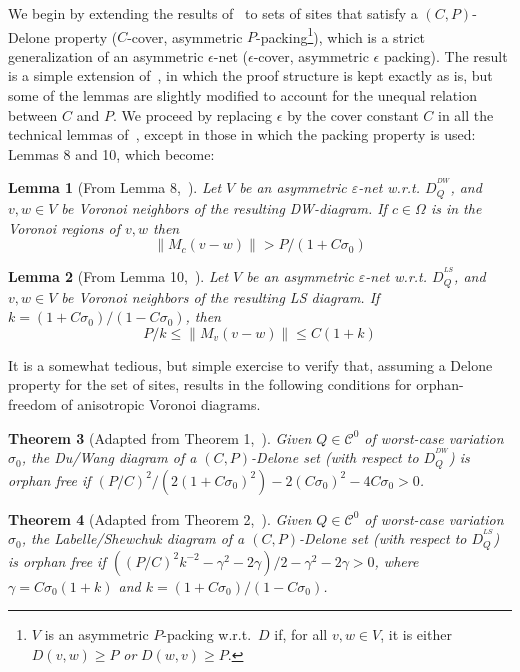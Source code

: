\documentclass[11pt]{article}
\newtheorem{theorem}{Theorem}[section]
\newtheorem{lemma}[theorem]{Lemma}
\newcommand{\e}{\varepsilon}
\newcommand{\s}{\sigma}
\renewcommand{\O}{\Omega}
\newcommand{\C}{\mathcal{C}}
\begin{document}
We begin by extending the results of~\cite{avd} to sets of sites that satisfy a $(C,P)$-Delone property ($C$-cover, asymmetric $P$-packing\footnote{$V$ is an asymmetric $P$-packing w.r.t.\ $D$ if, for all $v,w\in V$, it is either $D(v,w)\ge P$ \emph{or} $D(w,v)\ge P$.}), 
	which is a strict generalization of an asymmetric $\epsilon$-net ($\epsilon$-cover, asymmetric $\epsilon$ packing). 
The result is a simple extension of~\cite{avd}, in which the proof structure is kept exactly as is, 
	but some of the lemmas are slightly modified to account for the unequal relation between $C$ and $P$. 
We proceed by replacing $\epsilon$ by the cover constant $C$ in all the technical lemmas of~\cite{avd}, 
	except in those in which the packing property is used: Lemmas 8 and 10, which become:
	
\begin{lemma}[From Lemma 8,~\cite{avd}] 
	Let $V$ be an asymmetric $\e$-net w.r.t. $D_Q^{{ }^{DW}}$, and $v,w\in V$ be Voronoi neighbors of the resulting DW-diagram. 
	If $c\in\O$ is in the Voronoi regions of $v,w$ then
		\[ \|M_c (v-w)\| > P / (1+C\s_0) \]
\end{lemma}

\begin{lemma}[From Lemma 10,~\cite{avd}]
	Let $V$ be an asymmetric $\e$-net w.r.t. $D_Q^{{ }^{LS}}$, and $v,w\in V$ be Voronoi neighbors of the resulting LS diagram. 
	If $k=(1+C\s_0) / (1-C\s_0)$, then 
		\[ P/k \le \|M_v (v-w)\| \le C(1+k) \]
\end{lemma}


It is a somewhat tedious, but simple exercise to verify that, assuming a Delone property for the set of sites, results in the following conditions for orphan-freedom of anisotropic Voronoi diagrams. 

\begin{theorem}[Adapted from Theorem 1,~\cite{avd}]\label{th1}
Given $Q\in\C^0$ of worst-case variation $\s_0$, 
	the Du/Wang diagram of a $(C,P)$-Delone set (with respect to $D_Q^{{ }^{DW}}$) is orphan free if 
	$(P/C)^2 / \left( 2 (1 + C\s_0)^2 \right) - 2(C\s_0)^2 - 4C\s_0 > 0$.
\end{theorem}


\begin{theorem}[Adapted from Theorem 2,~\cite{avd}]\label{th2}
Given $Q\in\C^0$ of worst-case variation $\s_0$, 
	the Labelle/Shewchuk diagram of a $(C,P)$-Delone set (with respect to $D_Q^{{ }^{LS}}$) is orphan free if 
	$\left((P/C)^2 k^{-2} - \gamma^2 - 2\gamma\right)/2  - \gamma^2 - 2\gamma > 0$, where $\gamma=C\s_0(1+k)$ and $k=(1+C\s_0) / (1-C\s_0)$. 
\end{theorem}
\end{document}
